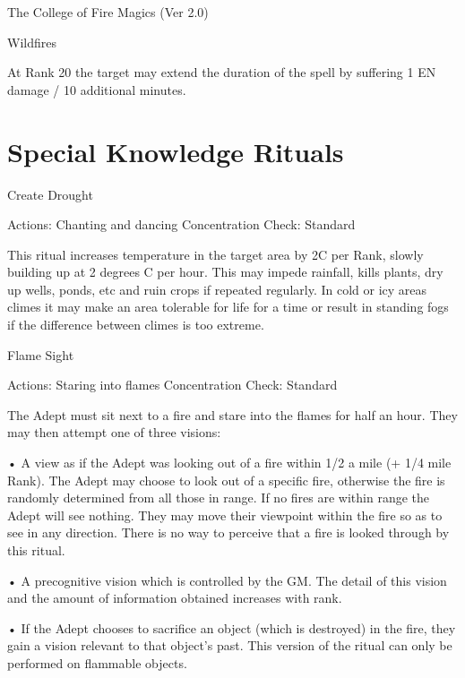 \begin{Chapter}{The College of Fire Magics (Ver 2.0)}
\begin{spell}[S-14]{Wildfires}
\begin{effects}
At Rank 20 the target may extend the duration of the spell by
suffering 1 EN damage / 10 additional minutes.
\end{effects}
\end{spell}

\section{Special Knowledge Rituals}

\begin{ritual}[R-1]{Create Drought}

Actions: Chanting and dancing 
Concentration Check: Standard 
\begin{effects}
This ritual increases temperature in the target area by 2C per Rank,
slowly building up at 2 degrees C per hour. This may impede rainfall,
kills plants, dry up wells, ponds, etc and ruin crops if repeated
regularly.  In cold or icy areas climes it may make an area tolerable
for life for a time or result in standing fogs if the difference
between climes is too extreme.
\end{effects}
\end{ritual}

\begin{ritual}[R-2]{Flame Sight}

Actions: Staring into flames 
Concentration Check: Standard 
\begin{effects}
The Adept must sit next to a fire and stare into the flames for half
an hour.  They may then attempt one of three visions:

• A view as if the Adept was looking out of a fire within 1/2 a mile
(+ 1/4 mile Rank).  The Adept may choose to look out of a specific
fire, otherwise the fire is randomly determined from all those in
range.  If no fires are within range the Adept will see nothing.  They
may move their viewpoint within the fire so as to see in any
direction. There is no way to perceive that a fire is looked through
by this ritual.

• A precognitive vision which is controlled by the GM.  The detail of
this vision and the amount of information obtained increases with
rank.

• If the Adept chooses to sacrifice an object (which is destroyed) in
the fire, they gain a vision relevant to that object’s past.  This
version of the ritual can only be performed on flammable objects.
\end{effects}
\end{ritual}


\end{Chapter}
